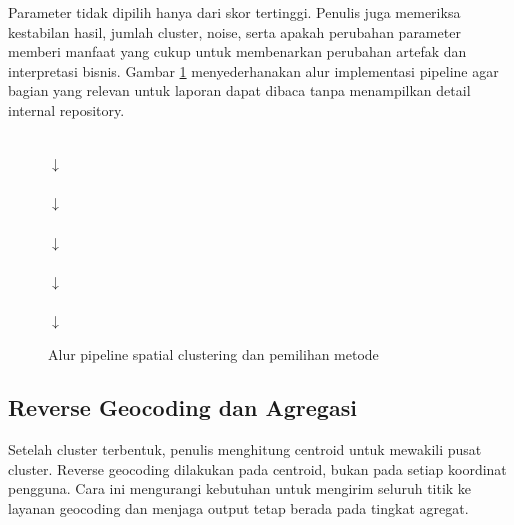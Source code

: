 Parameter tidak dipilih hanya dari skor tertinggi. Penulis juga memeriksa kestabilan hasil, jumlah cluster, noise, serta apakah perubahan parameter memberi manfaat yang cukup untuk membenarkan perubahan artefak dan interpretasi bisnis. Gambar \ref{fig:spatial-pipeline} menyederhanakan alur implementasi pipeline agar bagian yang relevan untuk laporan dapat dibaca tanpa menampilkan detail internal repository.

\begin{figure}[htbp]
\centering
\small
\setlength{\fboxsep}{6pt}
\\[0.12cm] $\downarrow$ \\[0.12cm]
\\[0.12cm] $\downarrow$ \\[0.12cm]
\\[0.12cm] $\downarrow$ \\[0.12cm]
\\[0.12cm] $\downarrow$ \\[0.12cm]
\\[0.12cm] $\downarrow$ \\[0.12cm]
\caption{Alur pipeline spatial clustering dan pemilihan metode}
\label{fig:spatial-pipeline}
\end{figure}

\subsection{Reverse Geocoding dan Agregasi}
Setelah cluster terbentuk, penulis menghitung centroid untuk mewakili pusat cluster. Reverse geocoding dilakukan pada centroid, bukan pada setiap koordinat pengguna. Cara ini mengurangi kebutuhan untuk mengirim seluruh titik ke layanan geocoding dan menjaga output tetap berada pada tingkat agregat.


